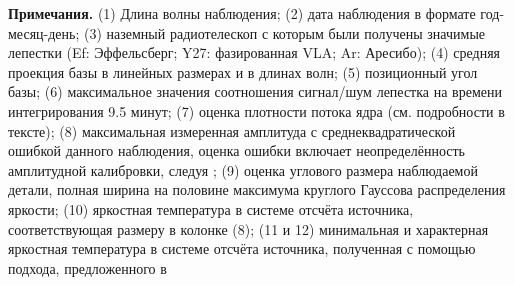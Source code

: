 \begin{table}[tbh]
\caption{Результаты наземно-космических измерений квазара 3C\,273 на РадиоАстроне}
\label{tab:3c273_results}
\scriptsize
{}
\textbf{Примечания.}
(1) Длина волны наблюдения; (2) дата наблюдения в формате год-месяц-день; (3) наземный
радиотелескоп с которым были получены значимые лепестки (Ef: Эффельсберг; Y27: фазированная VLA;
Ar: Аресибо); (4) средняя проекция базы в линейных размерах и в длинах волн; (5) позиционный угол
базы; (6) максимальное значения соотношения сигнал/шум лепестка на времени интегрирования 9.5
минут; (7) оценка плотности потока ядра (см. подробности в тексте); (8) максимальная измеренная
амплитуда с среднеквадратической ошибкой данного наблюдения, оценка ошибки включает
неопределённость амплитудной калибровки, следуя \cite{Kovalev_2014_rus}; (9) оценка углового
размера наблюдаемой детали, полная ширина на половине максимума круглого Гауссова распределения
яркости; (10) яркостная температура в системе отсчёта источника, соответствующая размеру в колонке
(8); (11 и 12) минимальная и характерная яркостная температура в системе отсчёта источника,
полученная с помощью подхода, предложенного в \cite{Lobanov_2015a}
\end{table}

